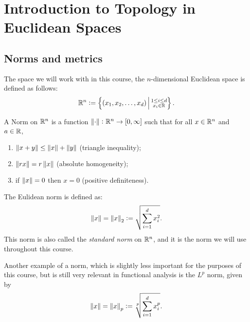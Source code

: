 \documentclass[11pt,a4paper]{article}
\begin{document}
\maketitle


\newpage
\tableofcontents
\newpage

\section{Introduction to Topology in Euclidean Spaces}
\subsection{Norms and metrics}
\begin{definition}
  The space we will work with in this course, the $n$-dimensional Euclidean
  space is defined as follows:
  \[
    \mathbb{R}^n := \left\{(x_1,x_2,\dots,x_d) \,\middle\vert\,
      \substack{1 \le i \le d \\ x_i\in\mathbb{R}}\right\}.
  \]
\end{definition}

\begin{definition}[Norm]
  A Norm on $\mathbb{R}^n$ is a function 
  $\left\lVert\cdot\right\rVert \colon \mathbb{R}^n \to [0,\infty]$
  such that for all $x \in \mathbb{R}^n$ and $a \in \mathbb{R}$,
  \begin{enumerate}
    \item[(1)] $\left\lVert x + y\right\rVert \le \left\lVert x\right\rVert + \left\lVert y\right\rVert$ (triangle inequality);
    \item[(2)] $\left\lVert r x\right\rVert = r \left\lVert x\right\rVert$ (absolute homogeneity);
    \item[(3)] if $\left\lVert x\right\rVert = 0$ then $x = 0$ (positive definiteness).
  \end{enumerate}
\end{definition}

\begin{definition}
  The Eulidean norm is defined as:
  \[
    \left\lVert x\right\rVert = \left\lVert x\right\rVert_2 := \sqrt{\sum_{i=1}^{d}{x_i^2}}.
  \]
  This norm is also called the \textit{standard norm} on $\mathbb{R}^n$,
  and it is the norm we will use throughout this course.
\end{definition}

\begin{definition}[$L^p$ norm]
  Another example of a norm, which is slightly less important
  for the purposes of this course,
  but is still very relevant in functional analysis is the $L^p$ norm,
  given by
  \[
    \left\lVert x\right\rVert = \left\lVert x\right\rVert_p := \sqrt[p]{\sum_{i=1}^{d}{x_i^p}}.
  \]
\end{definition}
\end{document}
